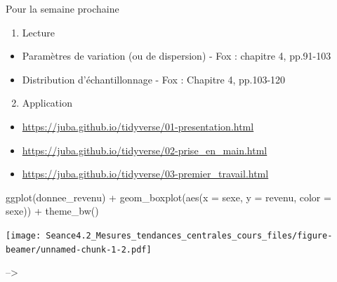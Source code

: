 \documentclass[
  ignorenonframetext,
]{beamer}
\newenvironment{Shaded}{\begin{snugshade}}{\end{snugshade}}
\newcommand{\AttributeTok}[1]{\textcolor[rgb]{0.77,0.63,0.00}{#1}}
\newcommand{\FunctionTok}[1]{\textcolor[rgb]{0.00,0.00,0.00}{#1}}
\newcommand{\NormalTok}[1]{#1}
\newcommand{\SpecialCharTok}[1]{\textcolor[rgb]{0.00,0.00,0.00}{#1}}
\providecommand{\tightlist}{%
  \setlength{\itemsep}{0pt}\setlength{\parskip}{0pt}}
\begin{document}
\begin{frame}[fragile]{Pour la semaine prochaine}
\protect\hypertarget{pour-la-semaine-prochaine}{}
\begin{enumerate}
\tightlist
\item
  Lecture
\end{enumerate}

\begin{itemize}
\tightlist
\item
  Paramètres de variation (ou de dispersion) - Fox : chapitre 4,
  pp.91-103
\item
  Distribution d'échantillonnage - Fox : Chapitre 4, pp.103-120
\end{itemize}

\begin{enumerate}
\setcounter{enumi}{1}
\tightlist
\item
  Application
\end{enumerate}

\begin{itemize}
\tightlist
\item
  \url{https://juba.github.io/tidyverse/01-presentation.html}
\item
  \url{https://juba.github.io/tidyverse/02-prise_en_main.html}
\item
  \url{https://juba.github.io/tidyverse/03-premier_travail.html}
\end{itemize}

\begin{Shaded}
\begin{Highlighting}[]
\FunctionTok{ggplot}\NormalTok{(donnee\_revenu) }\SpecialCharTok{+}
  \FunctionTok{geom\_boxplot}\NormalTok{(}\FunctionTok{aes}\NormalTok{(}\AttributeTok{x =}\NormalTok{ sexe, }\AttributeTok{y =}\NormalTok{ revenu, }\AttributeTok{color =}\NormalTok{ sexe)) }\SpecialCharTok{+}
  \FunctionTok{theme\_bw}\NormalTok{()}
\end{Highlighting}
\end{Shaded}

\texttt{[image: Seance4.2\_Mesures\_tendances\_centrales\_cours\_files/figure-beamer/unnamed-chunk-1-2.pdf]}

--\textgreater{}
\end{frame}
\end{document}
